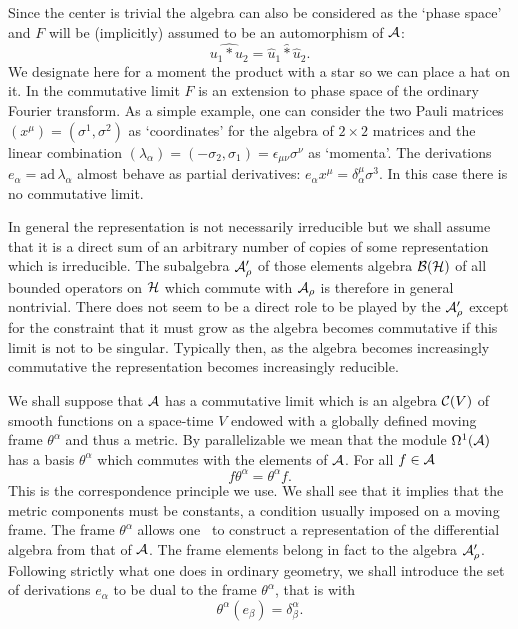 \documentclass[12pt,a4paper]{article}
\newcounter{eg}
\def\ad{\mbox{ad}\,}
\def\c#1{{\cal #1}}
\def\wm{\mathbin{*}}
\def\hwm{\mathbin{\hat *}}
\begin{document}
Since the center is trivial the algebra can also be considered as the
`phase space' and $F$ will be (implicitly) assumed to be an
automorphism of $\c{A}$:
$$
\widehat{u_1 \wm u_2} = \hat u_1 \hwm \hat u_2.
$$
We designate here for a moment the product with a star so we can
place a hat on it. In the commutative limit $F$ is an extension to phase
space of the ordinary Fourier transform.  As a simple example, one can
consider the two Pauli matrices $(x^\mu) = (\sigma^1,\sigma^2)$ as
`coordinates' for the algebra of $2\times 2$ matrices and the linear
combination 
$(\lambda_\alpha) = (-\sigma_2,\sigma_1) = \epsilon_{\mu\nu} \sigma^\nu$ 
as `momenta'. The derivations $e_\alpha = \ad \lambda_\alpha$ almost
behave as partial derivatives: $e_\alpha x^\mu = \delta^\mu_\alpha \sigma^3$. 
In this case there is no commutative limit.

In general the representation is not necessarily irreducible but we
shall assume that it is a direct sum of an arbitrary number of copies
of some representation which is irreducible.  The subalgebra
$\c{A}^\prime_\rho$ of those elements algebra $\c{B}(\c{H})$ of all
bounded operators on $\c{H}$ which commute with $\c{A}_\rho$ is
therefore in general nontrivial.  There does not seem to be a direct
role to be played by the $\c{A}^\prime_\rho$ except for the constraint
that it must grow as the algebra becomes commutative if this limit is
not to be singular.  Typically then, as the algebra becomes
increasingly commutative the representation becomes increasingly
reducible.

We shall suppose that $\c{A}$ has a commutative limit which is an
algebra $\c{C}(V)$ of smooth functions on a space-time $V$ endowed
with a globally defined moving frame $\theta^\alpha$ and thus a
metric.  By parallelizable we mean that the module $\Omega^1(\c{A})$
has a basis $\theta^\alpha$ which commutes with the elements of
$\c{A}$. For all $f \in \c{A}$
\begin{equation}
f\theta^\alpha = \theta^\alpha f.                          \label{f-theta}
\end{equation}
This is the correspondence principle we use. We shall see that it
implies that the metric components must be constants, a condition
usually imposed on a moving frame. The frame $\theta^\alpha$ allows
one~\cite{Mad00c} to construct a representation of the differential
algebra from that of $\c{A}$. The frame elements belong in fact to the
algebra $\c{A}^\prime_\rho$. Following strictly what one does in
ordinary geometry, we shall introduce the set of derivations
$e_\alpha$ to be dual to the frame $\theta^\alpha$, that is with
$$
\theta^\alpha(e_\beta) = \delta^\alpha_\beta.
$$ 
\end{document}
